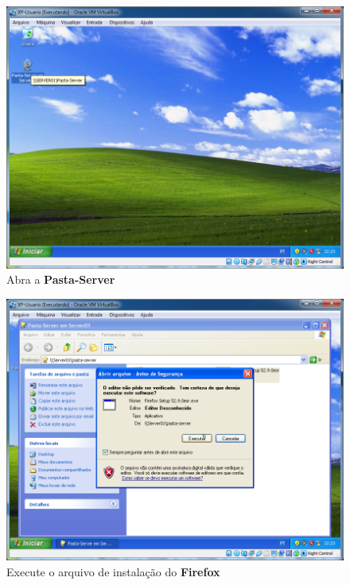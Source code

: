 \documentclass[10pt]{article}
\begin{document}
\begin{figure}[H]
    \centering
    \caption{Abra a \textbf{Pasta-Server}}
    \label{fig:re068}
    \includegraphics[width=\linewidth]{images/rede_externa/re068.png}
\end{figure}
\begin{figure}[H]
    \centering
    \caption{Execute o arquivo de instalação do \textbf{Firefox}}
    \label{fig:re071}
    \includegraphics[width=\linewidth]{images/rede_externa/re071.png}
\end{figure}
\end{document}
